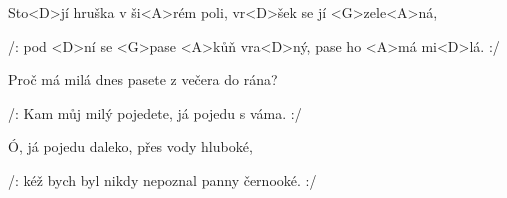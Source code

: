 

\zs
Sto<D>jí hruška v ši<A>rém poli, vr<D>šek se jí <G>zele<A>ná,

/: pod <D>ní se <G>pase <A>kůň vra<D>ný, pase ho <A>má mi<D>lá. :/
\ks

\zs
Proč má milá dnes pasete z večera do rána?

/: Kam můj milý pojedete, já pojedu s váma. :/
\ks

\zs
Ó, já pojedu daleko, přes vody hluboké,

/: kéž bych byl nikdy nepoznal panny černooké. :/
\ks

\kp
